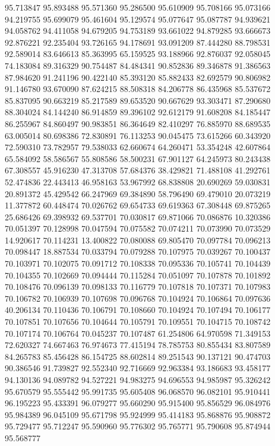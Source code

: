 95.713847
95.893488
95.571360
95.286500
95.610909
95.708166
95.073166
94.219755
95.699079
95.461604
95.129574
95.077647
95.087787
94.939621
94.058762
94.411058
94.679205
94.753189
93.661022
94.879285
93.666673
92.876221
92.235404
93.726165
94.178691
93.091209
87.444280
88.798531
92.589014
83.646613
85.363995
65.159525
93.188966
92.876037
92.058045
74.183084
89.316329
90.754487
84.484341
90.852836
89.346878
91.386563
87.984620
91.241196
90.422140
85.393120
85.882433
82.692579
90.806982
91.146780
93.670090
87.624215
88.508318
84.206778
86.435968
85.537672
85.837095
90.663219
85.217589
89.653520
90.667629
93.303471
87.290680
88.304024
84.144240
86.914859
89.396102
92.612179
91.608208
84.185447
86.255967
84.860497
90.983851
86.364649
82.410297
76.885970
88.689535
63.005014
80.698386
72.830891
76.113253
90.045475
73.615266
60.343920
72.590310
73.782957
79.538033
62.660674
64.260471
53.354248
42.607864
65.584092
58.586567
55.808586
58.500231
67.901127
64.245973
80.243438
67.308557
45.916230
47.313708
57.684376
38.429821
71.488108
41.292761
52.474836
22.443413
46.958163
53.967992
68.838808
20.690269
59.030831
20.891372
45.429542
66.247969
69.384890
58.796490
69.479010
20.073219
11.377872
60.448474
70.026762
69.654733
69.619363
67.308448
69.875265
25.686426
69.398932
69.537701
70.030817
69.871066
70.086876
10.320386
70.051397
70.128998
70.047594
70.075582
70.074211
70.073990
70.073529
14.920617
70.114231
13.400822
70.080088
69.805470
70.097784
70.096213
70.098447
18.887534
70.033794
70.079288
70.107975
70.039267
70.100437
70.103971
70.102075
70.091712
70.108338
70.095336
70.105741
70.104439
70.104355
70.102669
70.094444
70.115284
70.051097
70.107878
70.101892
70.108476
70.096139
70.098133
70.116779
70.107818
70.107371
70.107983
70.106782
70.106939
70.107698
70.096768
70.104924
70.106864
70.097636
40.206134
70.110436
70.106791
70.108660
70.104924
70.107494
70.106177
70.107851
70.107656
70.104644
70.105791
70.109551
70.104715
70.108742
70.107174
70.106764
70.045237
70.107487
61.254806
64.970598
71.349153
72.620327
74.667463
76.974673
77.415194
78.785753
80.855434
83.807589
84.265783
85.456428
86.154725
88.602814
89.251543
90.137121
90.474703
90.386546
91.739827
92.552340
92.716669
92.963384
93.186683
93.458177
94.130136
94.089782
94.527221
94.983275
94.696553
94.985987
95.326242
95.670579
95.555442
95.991735
95.605408
96.068570
96.082101
95.910441
96.195223
95.433391
96.079277
95.660290
95.915400
95.856529
96.084976
95.984389
96.045109
95.671798
95.924999
95.414183
95.868876
95.908872
95.729477
95.712247
95.590960
95.776302
95.765771
95.790608
95.874944
95.568777
